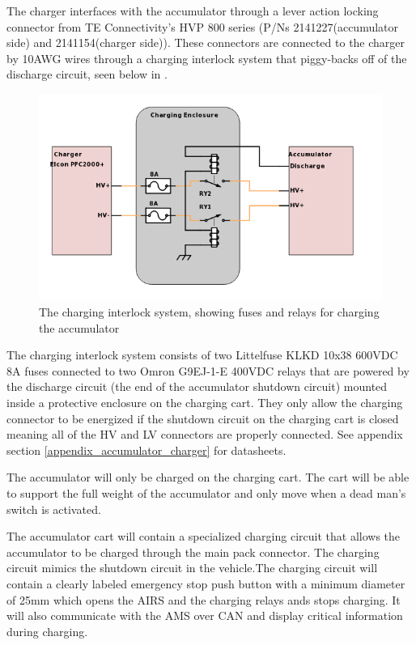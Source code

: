 \documentclass{article}
\begin{document}
	The charger interfaces with the accumulator through a lever action locking connector from TE Connectivity's HVP 800 series (P/Ns 2141227(accumulator side) and 2141154(charger side)). These connectors are connected to the charger by 10AWG wires through a charging interlock system that piggy-backs off of the discharge circuit, seen below in .


	 \begin{figure}[H]
		\centering
		\includegraphics[width = 0.7 \textwidth]{Charging-Interlock.png}
		\caption{The charging interlock system, showing fuses and relays for charging the accumulator}
		\label{fig:ChargerInterlock}
	\end{figure}
	
    The charging interlock system consists of two Littelfuse KLKD 10x38 600VDC 8A fuses connected to two Omron G9EJ-1-E 400VDC relays that are powered by the discharge circuit (the end of the accumulator shutdown circuit) mounted inside a protective enclosure on the charging cart. They only allow the charging connector to be energized if the shutdown circuit on the charging cart is closed meaning all of the HV and LV connectors are properly connected. See appendix section \ref{appendix_accumulator_charger} for datasheets.
 	
	The accumulator will only be charged on the charging cart. The cart will be able to support the full weight of the accumulator and only move when a dead man's switch is activated.
	
	The accumulator cart will contain a specialized charging circuit that allows the accumulator to be charged through the main pack connector. The charging circuit mimics the shutdown circuit in the vehicle.The charging circuit will contain a clearly labeled emergency stop push button with a minimum diameter of 25mm which opens the AIRS and the charging relays ands stops charging. It will also communicate with the AMS over CAN and display critical information during charging.
	
\end{document}
